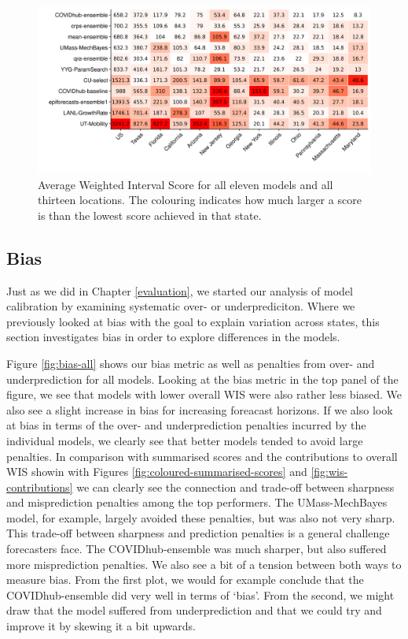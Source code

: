 \documentclass[
]{book}
\begin{document}
\begin{figure}
\includegraphics[width=1\linewidth]{../visualisation/chapter-5-results/scenario-baseline/heatmap-model-scores} \caption{Average Weighted Interval Score for all eleven models and all thirteen locations. The colouring indicates how much larger a score is than the lowest score achieved in that state.}\label{fig:heatmap-performance-states}
\end{figure}

\hypertarget{bias}{%
\subsection{Bias}\label{bias}}

Just as we did in Chapter \ref{evaluation}, we started our analysis of model calibration by examining systematic over- or underprediciton. Where we previously looked at bias with the goal to explain variation across states, this section investigates bias in order to explore differences in the models.

Figure \ref{fig:bias-all} shows our bias metric as well as penalties from over- and underprediction for all models. Looking at the bias metric in the top panel of the figure, we see that models with lower overall WIS were also rather less biased. We also see a slight increase in bias for increasing foreacast horizons. If we also look at bias in terms of the over- and underprediction penalties incurred by the individual models, we clearly see that better models tended to avoid large penalties. In comparison with summarised scores and the contributions to overall WIS showin with Figures \ref{fig:coloured-summarised-scores} and \ref{fig:wis-contributions} we can clearly see the connection and trade-off between sharpness and misprediction penalties among the top performers. The UMass-MechBayes model, for example, largely avoided these penalties, but was also not very sharp. This trade-off between sharpness and prediction penalties is a general challenge forecasters face. The COVIDhub-ensemble was much sharper, but also suffered more misprediction penalties. We also see a bit of a tension between both ways to measure bias. From the first plot, we would for example conclude that the COVIDhub-ensemble did very well in terms of `bias'. From the second, we might draw that the model suffered from underprediction and that we could try and improve it by skewing it a bit upwards.
\end{document}
